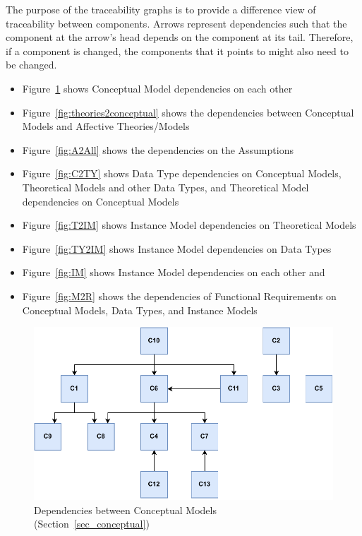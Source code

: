 The purpose of the traceability graphs is to provide a difference view of
traceability between components. Arrows represent dependencies such that the
component at the arrow's head depends on the component at its tail. Therefore,
if a component is changed, the components that it points to might also need to
be changed.
\begin{itemize}

    \item Figure~\ref{fig:conceptualdependencies} shows Conceptual Model
    dependencies on each other

    \item Figure~\ref{fig:theories2conceptual} shows the dependencies between
    Conceptual Models and Affective Theories/Models

    \item Figure~\ref{fig:A2All} shows the dependencies on the Assumptions

    \item Figure~\ref{fig:C2TY} shows Data Type dependencies on Conceptual
    Models, Theoretical Models and other Data Types, and Theoretical Model
    dependencies on Conceptual Models

    \item Figure~\ref{fig:T2IM} shows Instance Model dependencies on
    Theoretical Models

    \item Figure~\ref{fig:TY2IM} shows Instance Model dependencies on Data Types

    \item Figure~\ref{fig:IM} shows Instance Model dependencies on each other
    and 

    \item Figure~\ref{fig:M2R} shows the dependencies of Functional
    Requirements on Conceptual Models, Data Types, and Instance Models

\end{itemize}

\vspace*{\fill}
\begin{figure}[tbh]
    \centering
    \includegraphics[width=0.87\linewidth]{figures/concept2concept.pdf}
    \caption[Dependencies between Conceptual Models]{Dependencies between
        Conceptual Models (Section~\ref{sec_conceptual})}
    \label{fig:conceptualdependencies}
\end{figure}
\vspace*{\fill}

